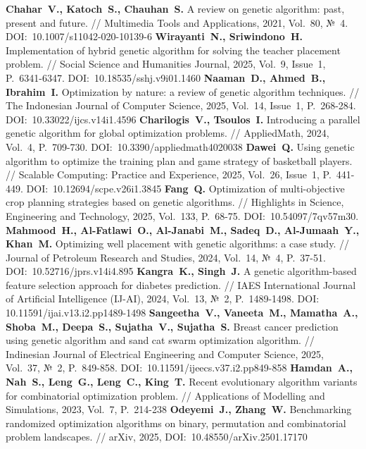 \begin{thebibliography}{99}
%
\textbf{Chahar~V., Katoch~S., Chauhan~S.} A review on genetic algorithm: past, present and future. // Multimedia Tools and Applications, 2021, Vol.~80, №~4. DOI:~10.1007/s11042-020-10139-6
%
\textbf{Wirayanti~N., Sriwindono~H.} Implementation of hybrid genetic algorithm for solving the teacher placement problem. // Social Science and Humanities Journal, 2025, Vol.~9, Issue~1, P.~6341-6347. DOI:~10.18535/sshj.v9i01.1460
%
\textbf{Naaman~D., Ahmed~B., Ibrahim~I.} Optimization by nature: a review of genetic algorithm techniques. // The Indonesian Journal of Computer Science, 2025, Vol.~14, Issue~1, P.~268-284. DOI:~10.33022/ijcs.v14i1.4596
%
\textbf{Charilogis~V., Tsoulos~I.} Introducing a parallel genetic algorithm for global optimization problems. // AppliedMath, 2024, Vol.~4, P.~709-730. DOI:~10.3390/appliedmath4020038
%
\textbf{Dawei~Q.} Using genetic algorithm to optimize the training plan and game strategy of basketball players. // Scalable Computing: Practice and Experience, 2025, Vol.~26, Issue~1, P.~441-449. DOI:~10.12694/scpe.v26i1.3845
%
\textbf{Fang~Q.} Optimization of multi-objective crop planning strategies based on genetic algorithms. // Highlights in Science, Engineering and Technology, 2025, Vol.~133, P.~68-75. DOI:~10.54097/7qv57m30.
%
\textbf{Mahmood~H., Al-Fatlawi~O., Al-Janabi~M., Sadeq~D., Al-Jumaah~Y., Khan~M.} Optimizing well placement with genetic algorithms: a case study. // Journal of Petroleum Research and Studies, 2024, Vol.~14, №~4, P.~37-51. DOI:~10.52716/jprs.v14i4.895
%
\textbf{Kangra~K., Singh~J.} A genetic algorithm-based feature selection approach for diabetes prediction. // IAES International Journal of Artificial Intelligence (IJ-AI), 2024, Vol.~13, №~2, P.~1489-1498. DOI: 10.11591/ijai.v13.i2.pp1489-1498
%
\textbf{Sangeetha~V., Vaneeta~M., Mamatha~A., Shoba~M., Deepa~S., Sujatha~V., Sujatha~S.} Breast cancer prediction using genetic algorithm and sand cat swarm optimization algorithm. // Indinesian Journal of Electrical Engineering and Computer Science, 2025, Vol.~37, №~2, P.~849-858. DOI:~10.11591/ijeecs.v37.i2.pp849-858
%
\textbf{Hamdan~A., Nah~S., Leng~G., Leng~C., King~T.} Recent evolutionary algorithm variants for combinatorial optimization problem. // Applications of Modelling and Simulations, 2023, Vol.~7, P.~214-238
%
\textbf{Odeyemi~J., Zhang~W.} Benchmarking randomized optimization algorithms on binary, permutation and combinatorial problem landscapes. // arXiv, 2025, DOI:~10.48550/arXiv.2501.17170

\end{thebibliography}
